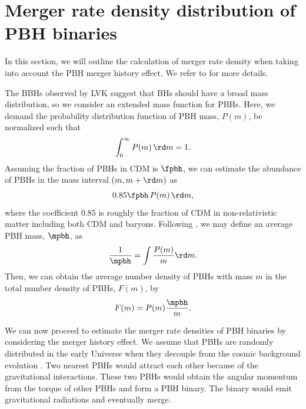 \documentclass[twocolumn]{aastex631}
\def\e{\begin{equation}}
\def\q{\end{equation}}
\begin{document}
\section{\label{merger}Merger rate density distribution of PBH binaries}

In this section, we will outline the calculation of merger rate density when taking into account the PBH merger history effect. We refer to \cite{Liu:2019rnx} for more details.

The BBHs observed by LVK suggest that BHs should have a broad mass distribution, so we consider an extended mass function for PBHs. Here, we demand the probability distribution function of PBH mass, $P(m)$, be normalized such that
\e\label{norm}
    \int_{0}^{\infty} P(m)\, \rd m = 1.
\q 
Assuming the fraction of PBHs in CDM is $\fpbh$, we can estimate the abundance of PBHs in the mass interval $(m, m+\rd m)$ as \citep{Chen:2018rzo}
\e 
    0.85 \fpbh\, P(m)\, \rd m,
\q 
where the coefficient $0.85$ is roughly the fraction of CDM in non-relativistic matter including both CDM and baryons. Following \cite{Liu:2019rnx}, we may define an average PBH mass, $\mpbh$, as
\e\label{mpbh}
    \frac{1}{\mpbh} = \int \frac{P(m)}{m} \rd m.
\q 
Then, we can obtain the average number density of PBHs with mass $m$ in the 
total number density of PBHs, $F(m)$, by \citep{Liu:2019rnx}
\e\label{Fm} 
    F(m) = P(m) \frac{\mpbh}{m}.
\q 

We can now proceed to estimate the merger rate densities of PBH binaries by considering the merger history effect.
We assume that PBHs are randomly distributed in the early Universe when they decouple from the cosmic background evolution \citep{Nakamura:1997sm,Sasaki:2016jop,Ali-Haimoud:2017rtz}. Two nearest PBHs would attract each other because of the gravitational interactions. These two PBHs would obtain the angular momentum from the torque of other PBHs and form a PBH binary. The binary would emit gravitational radiations and eventually merge. 
\end{document}
